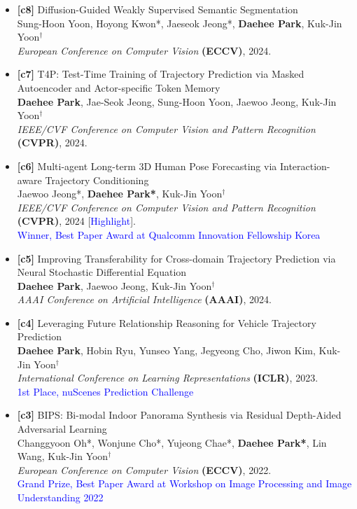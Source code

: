 \documentclass[a4paper,11pt]{article}
\begin{document}
\begin{itemize}[leftmargin=0.25cm]
\item \textbf{[c8]} Diffusion-Guided Weakly Supervised Semantic Segmentation\\
Sung-Hoon Yoon, Hoyong Kwon*, Jaeseok Jeong*, \textbf{Daehee Park}, Kuk-Jin Yoon$^\dagger$\\
\textit{European Conference on Computer Vision} \textbf{(ECCV)}, 2024.

\item \textbf{[c7]} T4P: Test-Time Training of Trajectory Prediction via Masked Autoencoder and Actor-specific Token Memory\\
\textbf{Daehee Park}, Jae-Seok Jeong, Sung-Hoon Yoon, Jaewoo Jeong, Kuk-Jin Yoon$^\dagger$\\
\textit{IEEE/CVF Conference on Computer Vision and Pattern Recognition} \textbf{(CVPR)}, 2024.

\item \textbf{[c6]} Multi-agent Long-term 3D Human Pose Forecasting via Interaction-aware Trajectory Conditioning\\
Jaewoo Jeong*, \textbf{Daehee Park*}, Kuk-Jin Yoon$^\dagger$\\
\textit{IEEE/CVF Conference on Computer Vision and Pattern Recognition} \textbf{(CVPR)}, 2024 [\textcolor{blue}{Highlight}].\\
\textcolor{blue}{Winner, Best Paper Award at Qualcomm Innovation Fellowship Korea}

\item \textbf{[c5]} Improving Transferability for Cross-domain Trajectory Prediction via Neural Stochastic Differential Equation\\
\textbf{Daehee Park}, Jaewoo Jeong, Kuk-Jin Yoon$^\dagger$\\
\textit{AAAI Conference on Artificial Intelligence} \textbf{(AAAI)}, 2024.

\item \textbf{[c4]} Leveraging Future Relationship Reasoning for Vehicle Trajectory Prediction\\
\textbf{Daehee Park}, Hobin Ryu, Yunseo Yang, Jegyeong Cho, Jiwon Kim, Kuk-Jin Yoon$^\dagger$\\
\textit{International Conference on Learning Representations} \textbf{(ICLR)}, 2023.\\
\textcolor{blue}{1st Place, nuScenes Prediction Challenge}

\item \textbf{[c3]} BIPS: Bi-modal Indoor Panorama Synthesis via Residual Depth-Aided Adversarial Learning\\
Changgyoon Oh*, Wonjune Cho*, Yujeong Chae*, \textbf{Daehee Park*}, Lin Wang, Kuk-Jin Yoon$^\dagger$\\
\textit{European Conference on Computer Vision} \textbf{(ECCV)}, 2022.\\
\textcolor{blue}{Grand Prize, Best Paper Award at Workshop on Image Processing and Image Understanding 2022}


\end{itemize}
\end{document}
